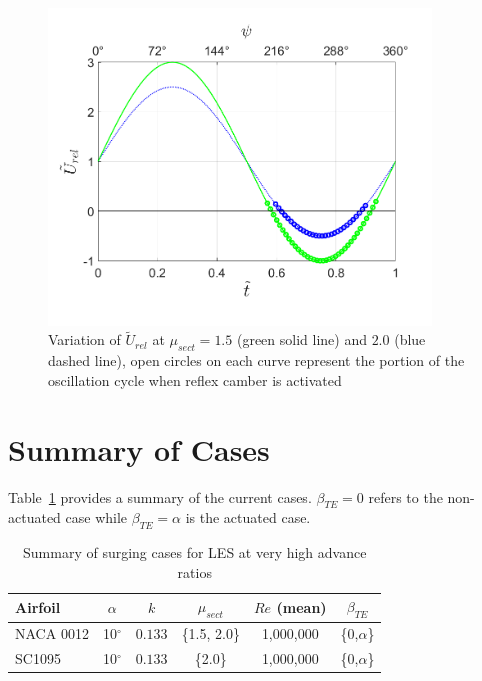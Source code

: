\begin{figure}[H]
\centering
\texttt{}		\includegraphics[width=4in]{figures/U_rel_vs_t_tilde_without_lines.png}
		\caption{Variation of $\tilde{U}_{rel}$ at $\mu_{sect}=1.5$ (green solid line) and $2.0$ (blue dashed line), open circles on each curve represent the portion of the oscillation cycle when reflex camber is activated}
		\label{fig:U_rel}
\end{figure}

\section{Summary of Cases}

Table~\ref{table:summary_cases_AC} provides a summary of the current cases. $\beta_{TE}=0$ refers to the non-actuated case while $\beta_{TE}=\alpha$ is the actuated case.

\begin{table}[H]
	\centering
	\caption{Summary of surging cases for LES at very high advance ratios}
	\label{table:summary_cases_AC}
	\begin{tabular}{|l|c|c|c|c|c|}
		\hline
		Airfoil   & $\alpha$ & $k$ & $\mu_{sect}$ & $Re$ (mean) & $\beta_{TE}$\\
		\hline
		\hline
		NACA 0012 & 10$^\circ$ & $0.133$ & \{1.5, 2.0\} & 1,000,000 & \{0,$\alpha$\} \\
		\hline
		SC1095 & 10$^\circ$ & $0.133$ & \{2.0\} & 1,000,000 & \{0,$\alpha$\} \\
		\hline
		
	\end{tabular}
	
\end{table}

